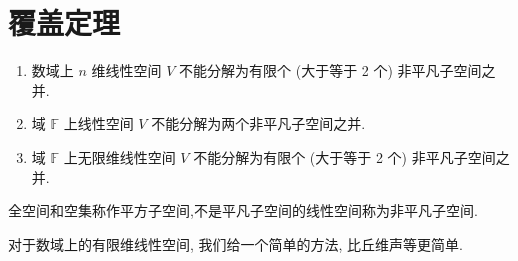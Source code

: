 \documentclass[../../main.tex]{subfiles}
\begin{document}
\section{覆盖定理}

\begin{theorem}[覆盖定理]\label{theorem:覆盖定理}
\begin{enumerate}
\item 数域上 \( n \) 维线性空间 \( V \) 不能分解为有限个 (大于等于 2 个) 非平凡子空间之并.  

\item 域 \( \mathbb{F} \) 上线性空间 \( V \) 不能分解为两个非平凡子空间之并. 

\item 域 \( \mathbb{F} \) 上无限维线性空间 \( V \) 不能分解为有限个 (大于等于 2 个) 非平凡子空间之并.  
\end{enumerate}
\end{theorem}
\begin{remark}
全空间和空集称作平方子空间,不是平凡子空间的线性空间称为非平凡子空间.
\end{remark}
\begin{note}
对于数域上的有限维线性空间, 我们给一个简单的方法, 比丘维声等更简单.  
\end{note}
\end{document}
